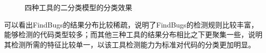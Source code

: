 \begin{figure}[h]
 \centering
\label{fig:6-3}
 \caption{四种工具的二分类模型的分类效果}
\end{figure}

可以看出FindBugs的结果分布比较稀疏，说明了FindBugs的检测规则比较丰富，能够检测的代码类型较多；而其他三种工具的结果分布相比之下更聚集一些，说明其检测所需的特征比较单一，以该工具检测能力为标准对代码的分类更加明显。

